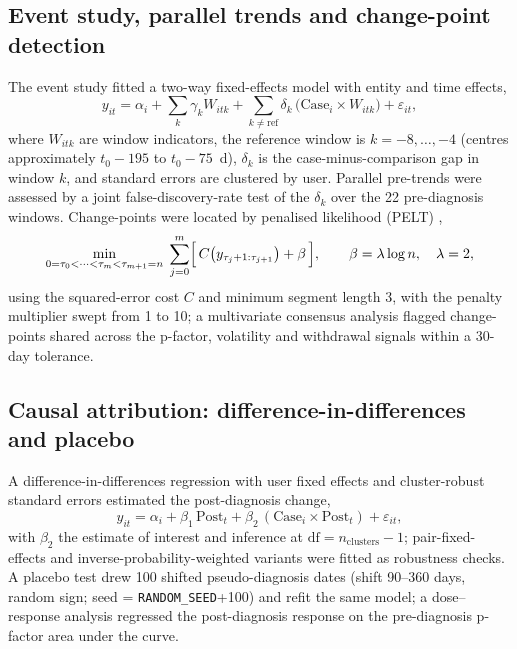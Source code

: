 \documentclass[11pt]{article}
\begin{document}
\subsection*{Event study, parallel trends and change-point detection}
The event study fitted a two-way fixed-effects model with entity and time effects,
\begin{equation}
y_{it}=\alpha_i+\sum_{k}\gamma_k W_{itk}
+\sum_{k\neq \mathrm{ref}}\delta_k\,\bigl(\mathrm{Case}_i\times W_{itk}\bigr)+\varepsilon_{it},
\label{eq:eventstudy}
\end{equation}
where $W_{itk}$ are window indicators, the reference window is $k=-8,\dots,-4$ (centres
approximately $t_0-195$ to $t_0-75$~d), $\delta_k$ is the case-minus-comparison gap in window
$k$, and standard errors are clustered by user. Parallel pre-trends were assessed by a joint
false-discovery-rate test of the $\delta_k$ over the 22 pre-diagnosis windows. Change-points
were located by penalised likelihood (PELT) \cite{killick2012optimal,truong2020selective},
\begin{equation}
\min_{0=\tau_0<\dots<\tau_{m}<\tau_{m+1}=n}\;
\sum_{j=0}^{m}\Bigl[\,C\bigl(y_{\tau_j+1:\tau_{j+1}}\bigr)+\beta\,\Bigr],
\qquad \beta=\lambda\log n,\quad \lambda=2,
\label{eq:pelt}
\end{equation}
using the squared-error cost $C$ and minimum segment length 3, with the penalty multiplier swept
from 1 to 10; a multivariate consensus analysis flagged change-points shared across the p-factor,
volatility and withdrawal signals within a 30-day tolerance.

\subsection*{Causal attribution: difference-in-differences and placebo}
A difference-in-differences regression with user fixed effects and cluster-robust standard
errors \cite{cameron2011robust} estimated the post-diagnosis change,
\begin{equation}
y_{it}=\alpha_i+\beta_1\,\mathrm{Post}_t+\beta_2\,(\mathrm{Case}_i\times\mathrm{Post}_t)+\varepsilon_{it},
\label{eq:did}
\end{equation}
with $\beta_2$ the estimate of interest and inference at $\mathrm{df}=n_{\text{clusters}}-1$;
pair-fixed-effects and inverse-probability-weighted variants were fitted as robustness checks.
A placebo test drew 100 shifted pseudo-diagnosis dates (shift 90--360 days, random sign;
seed = \texttt{RANDOM\_SEED}+100) and refit the same model; a dose--response analysis regressed
the post-diagnosis response on the pre-diagnosis p-factor area under the curve.
\end{document}
